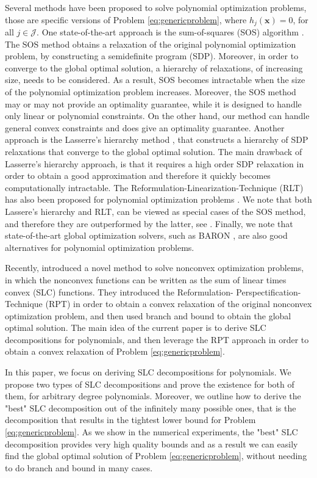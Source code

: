 \documentclass[opre,nonblindrev]{informs3} %
\begin{document}
Several methods have been proposed to solve polynomial optimization problems, those are specific versions of Problem \eqref{eq:genericproblem}, where $h_j(\boldsymbol{x}) = 0$, for all $j \in \mathcal{J}$. One state-of-the-art approach is the sum-of-squares (SOS) algorithm \cite{parrilo2003semidefinite}. The SOS method obtains a relaxation of the original polynomial optimization problem, by constructing a semidefinite program (SDP). Moreover, in order to converge to the global optimal solution, a hierarchy of relaxations, of increasing size, needs to be considered. As a result, SOS becomes intractable when the size of the polynomial optimization problem increases. Moreover, the SOS method may or may not provide an optimality guarantee, while it is designed to handle only linear or polynomial constraints. On the other hand, our method can handle general convex constraints and does give an optimality guarantee. Another approach is the Lasserre’s hierarchy method \cite{lasserre2001global, lasserre2008semidefinite, lasserre2009moments}, that constructs a hierarchy of SDP relaxations that converge to the global optimal solution. The main drawback of Lasserre’s hierarchy approach, is that it requires a high order SDP relaxation in order to obtain a good approximation and therefore it quickly becomes computationally intractable. The Reformulation-Linearization-Technique (RLT) has also been proposed for polynomial optimization problems \cite{sherali2013}. {\color{black} We note that both Lassere's hierarchy and RLT, can be viewed as special cases of the SOS method, and therefore they are outperformed by the latter, see \cite{parrilo2003semidefinite}}. Finally, we note that state-of-the-art global optimization solvers, such as BARON \cite{sahinidis1996baron}, are also good alternatives for polynomial optimization problems.

Recently, \cite{bertsimas2023novel} introduced a novel method to solve nonconvex optimization problems, in which the nonconvex functions can be written as the sum of linear times convex (SLC) functions. They introduced the Reformulation- Perspectification-Technique (RPT) in order to obtain a convex relaxation of the original nonconvex optimization problem, and then used branch and bound to obtain the global optimal solution. The main idea of the current paper is to derive SLC decompositions for polynomials, and then leverage the RPT approach in order to obtain a convex relaxation of Problem \eqref{eq:genericproblem}.

In this paper, we focus on deriving SLC decompositions for polynomials. We propose two types of SLC decompositions and prove the existence for both of them, for arbitrary degree polynomials. {\color{black} Moreover, we outline how to derive the "best" SLC decomposition out of the infinitely many possible ones, that is the decomposition that results in the tightest lower bound for Problem \eqref{eq:genericproblem}.} As we show in the numerical experiments, the "best" SLC decomposition provides very high quality bounds and as a result we can easily find the global optimal solution of Problem \eqref{eq:genericproblem}, without needing to do branch and bound in many cases.
\end{document}
